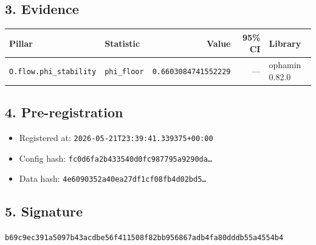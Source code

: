 \documentclass{article}
\begin{document}
\subsection*{3. Evidence}
\begin{tabular}{llrrl}\toprule
\textbf{Pillar} & \textbf{Statistic} & \textbf{Value} & \textbf{95\% CI} & \textbf{Library} \\\midrule
\texttt{O.flow.phi\_stability} & \texttt{phi\_floor} & \texttt{0.6603084741552229} & --- & ophamin 0.82.0 \\
\bottomrule\end{tabular}
\subsection*{4. Pre-registration}
\begin{itemize}
\item Registered at: \texttt{2026-05-21T23:39:41.339375+00:00}
\item Config hash: \texttt{fc0d6fa2b433540d0fc987795a9290da\dots}
\item Data hash: \texttt{4e6090352a40ea27df1cf08fb4d02bd5\dots}
\end{itemize}
\subsection*{5. Signature}
\texttt{b69c9ec391a5097b43acdbe56f411508f82bb956867adb4fa80dddb55a4554b4}\\
\end{document}

